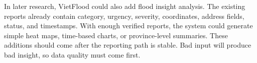 In later research, VietFlood could also add flood insight analysis. The existing reports already contain category, urgency, severity, coordinates, address fields, status, and timestamps. With enough verified reports, the system could generate simple heat maps, time-based charts, or province-level summaries. These additions should come after the reporting path is stable. Bad input will produce bad insight, so data quality must come first.

\endgroup
